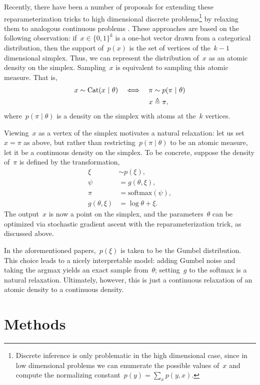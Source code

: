\documentclass{article}
\begin{document}
Recently, there have been a number of proposals for extending these
reparameterization tricks to high dimensional discrete
problems\footnote{Discrete inference is only problematic in the high
dimensional case, since in low dimensional problems we can enumerate
the possible values of~$x$ and compute the normalizing constant~$p(y)
= \sum_x p(y, x)$.} by relaxing them to analogous continuous
problems \citep{maddison2016concrete, jang2016categorical,
kusner2016gans}.  These approaches are based on the following
observation: if~$x \in \{0,1\}^k$ is a one-hot vector drawn from a
categorical distribution, then the support of~$p(x)$ is the set of
vertices of the~$k-1$ dimensional simplex.  Thus, we can represent the
distribution of~$x$ as an atomic density on the simplex.  Sampling~$x$
is equivalent to sampling this atomic measure. That is,
\begin{align}
  x &\sim \mathrm{Cat}( x ~\vert~ \theta) &\iff& & {\pi} &\sim p({\pi} ~\vert~ \theta) \nonumber \\
  & & & & x &\triangleq {\pi},
\end{align}
where~$p({\pi} \mid \theta)$ is a density on the simplex with atoms at
the~$k$ vertices.

Viewing~$x$ as a vertex of the simplex motivates a natural relaxation:
let us set~$x={\pi}$ as above, but 
rather than restricting~$p({\pi} \mid \theta)$ to be an atomic measure,
let it be a continuous density on the simplex. To be concrete, suppose
the density of~${\pi}$ is defined by the transformation,
\begin{align}
  \xi &\sim p(\xi), \\
  \psi & = g(\theta, \xi), \\
  {\pi} &=  \text{softmax}(\psi), \\
  g(\theta, \xi) &= \log \theta + \xi.
\end{align}
The output~$x$ is now a point on the simplex, and the parameters~$\theta$ can
be optimized via stochastic gradient ascent with the reparameterization trick,
as discussed above.

In the aforementioned papers,~$p(\xi)$ is taken to be the Gumbel distribution.
This choice leads to a nicely interpretable model: adding
Gumbel noise and taking the argmax yields an exact sample from~$\theta$;
setting~$g$ to the softmax is a natural relaxation. Ultimately, however, this
is just a continuous relaxation of an atomic density to a continuous
density. 
\section{Methods}
\end{document}

